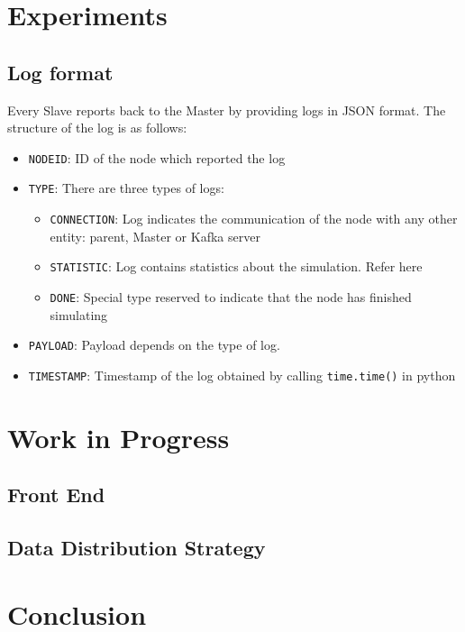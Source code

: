 \documentclass[a4paper, 12pt]{article}
\begin{document}
\section{Experiments}
\subsection{Log format}
Every Slave reports back to the Master by providing logs in JSON format. The structure of the log is as follows:
\begin{itemize}
    \item \texttt{NODE\textunderscore ID}: ID of the node which reported the log
    \item \texttt{TYPE}: There are three types of logs:
        \begin{itemize}
            \item \texttt{CONNECTION}: Log indicates the communication of the node with any other entity: parent, Master or Kafka server
            \item \texttt{STATISTIC}: Log contains statistics about the simulation. Refer here 
            \item \texttt{DONE}: Special type reserved to indicate that the node has finished simulating
        \end{itemize}
    \item \texttt{PAYLOAD}: Payload depends on the type of log.
    \item \texttt{TIMESTAMP}: Timestamp of the log obtained by calling \texttt{time.time()} in python
\end{itemize}

\section{Work in Progress}
\subsection{Front End} 

\subsection{Data Distribution Strategy}

\section{Conclusion}
\end{document}

